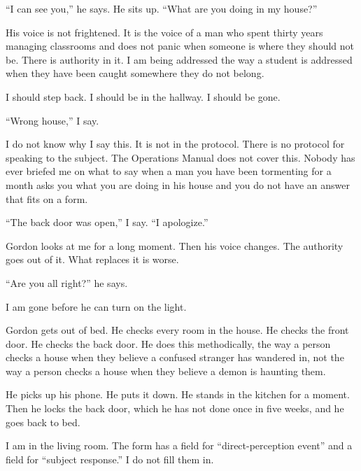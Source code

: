 ``I can see you,'' he says. He sits up. ``What are you doing in my house?''

His voice is not frightened. It is the voice of a man who spent thirty years managing classrooms and does not panic when someone is where they should not be. There is authority in it. I am being addressed the way a student is addressed when they have been caught somewhere they do not belong.

I should step back. I should be in the hallway. I should be gone.

``Wrong house,'' I say.

I do not know why I say this. It is not in the protocol. There is no protocol for speaking to the subject. The Operations Manual does not cover this. Nobody has ever briefed me on what to say when a man you have been tormenting for a month asks you what you are doing in his house and you do not have an answer that fits on a form.

``The back door was open,'' I say. ``I apologize.''

Gordon looks at me for a long moment. Then his voice changes. The authority goes out of it. What replaces it is worse.

``Are you all right?'' he says.

I am gone before he can turn on the light.

Gordon gets out of bed. He checks every room in the house. He checks the front door. He checks the back door. He does this methodically, the way a person checks a house when they believe a confused stranger has wandered in, not the way a person checks a house when they believe a demon is haunting them.

He picks up his phone. He puts it down. He stands in the kitchen for a moment. Then he locks the back door, which he has not done once in five weeks, and he goes back to bed.

I am in the living room. The form has a field for ``direct-perception event'' and a field for ``subject response.'' I do not fill them in.
